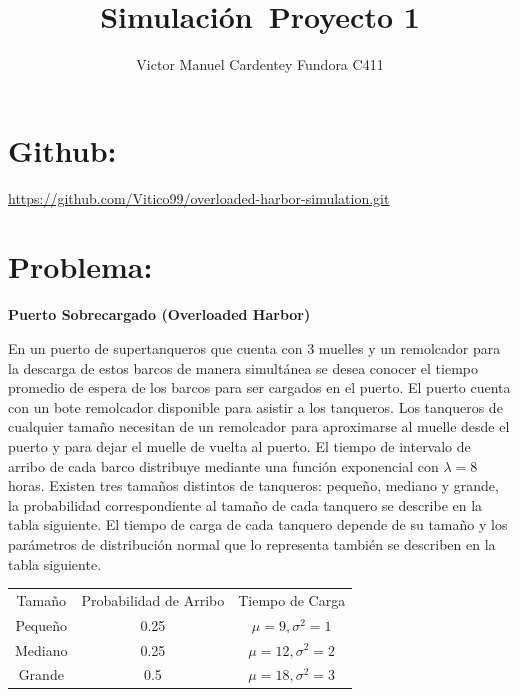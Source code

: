 \documentclass[titlepage,11pt]{scrartcl}
\title{	
    \normalfont\normalsize
	\vspace{25pt}
	{\huge Simulación\ Proyecto 1}
	\vspace{12pt}
}
\author{\LARGE Victor Manuel Cardentey Fundora C411}
\date{}
\begin{document}
\maketitle

\section{Github:}
	\url{https://github.com/Vitico99/overloaded-harbor-simulation.git}

\section{Problema:}

	\textbf{Puerto Sobrecargado (Overloaded Harbor)}

	En un puerto de supertanqueros que cuenta con 3 muelles y un remolcador para la descarga de estos barcos de manera simultánea se desea conocer el tiempo promedio de espera de los barcos para ser cargados en el puerto. El puerto cuenta con un bote remolcador disponible para asistir a los tanqueros. Los tanqueros de cualquier tamaño necesitan de un remolcador para aproximarse al muelle desde el puerto y para dejar el muelle de vuelta al puerto. El tiempo de intervalo de arribo de cada barco distribuye mediante una función exponencial con $\lambda = 8$ horas. Existen tres tamaños distintos de tanqueros: pequeño, mediano y grande, la probabilidad correspondiente al tamaño de cada tanquero se describe en la tabla siguiente. El tiempo de carga de cada tanquero depende de su tamaño y los parámetros de distribución normal que lo representa también se describen en la tabla siguiente.

	\begin{center}
		\begin{tabular}
			{c c c}
			\rule[-1ex]{0pt}{1.5ex} Tamaño & Probabilidad de Arribo & Tiempo de Carga \\
			\rule[-1ex]{0pt}{1.5ex} Pequeño & 0.25 & $\mu = 9, \sigma^2 = 1$ \\
			\rule[-1ex]{0pt}{1.5ex} Mediano & 0.25 & $\mu = 12, \sigma^2 = 2$ \\
			\rule[-1ex]{0pt}{1.5ex} Grande & 0.5 & $\mu = 18, \sigma^2 = 3$ \\
		\end{tabular}
	\end{center}
\end{document}
